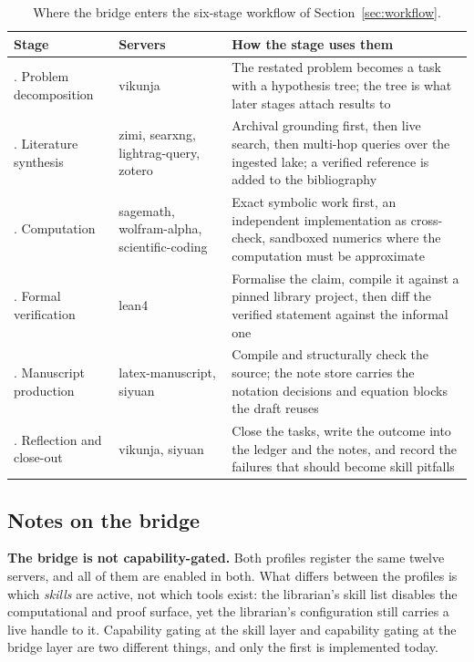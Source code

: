 \documentclass[10pt]{article}
\begin{document}
\begin{table}[htbp]
\centering\small
\caption{Where the bridge enters the six-stage workflow of Section~\ref{sec:workflow}.}\label{tab:mcpstages}
\renewcommand{\arraystretch}{1.15}
\begin{tabularx}{\textwidth}{@{}>{\raggedright\arraybackslash}p{2.9cm} >{\raggedright\arraybackslash}p{3.6cm} X@{}}
\toprule
\textbf{Stage} & \textbf{Servers} & \textbf{How the stage uses them} \\
\midrule
1. Problem decomposition & vikunja & The restated problem becomes a task with a hypothesis tree; the tree is what later stages attach results to \\
2. Literature synthesis & zimi, searxng, lightrag-query, zotero & Archival grounding first, then live search, then multi-hop queries over the ingested lake; a verified reference is added to the bibliography \\
3. Computation & sagemath, wolfram-alpha, scientific-coding & Exact symbolic work first, an independent implementation as cross-check, sandboxed numerics where the computation must be approximate \\
4. Formal verification & lean4 & Formalise the claim, compile it against a pinned library project, then diff the verified statement against the informal one \\
5. Manuscript production & latex-manuscript, siyuan & Compile and structurally check the source; the note store carries the notation decisions and equation blocks the draft reuses \\
6. Reflection and close-out & vikunja, siyuan & Close the tasks, write the outcome into the ledger and the notes, and record the failures that should become skill pitfalls \\
\bottomrule
\end{tabularx}
\end{table}

\subsection{Notes on the bridge}

\textbf{The bridge is not capability-gated.} Both profiles register the same twelve servers, and all
of them are enabled in both. What differs between the profiles is which \emph{skills} are active, not
which tools exist: the librarian's skill list disables the computational and proof surface, yet the
librarian's configuration still carries a live handle to it. Capability gating at the skill layer and
capability gating at the bridge layer are two different things, and only the first is implemented
today.
\end{document}
